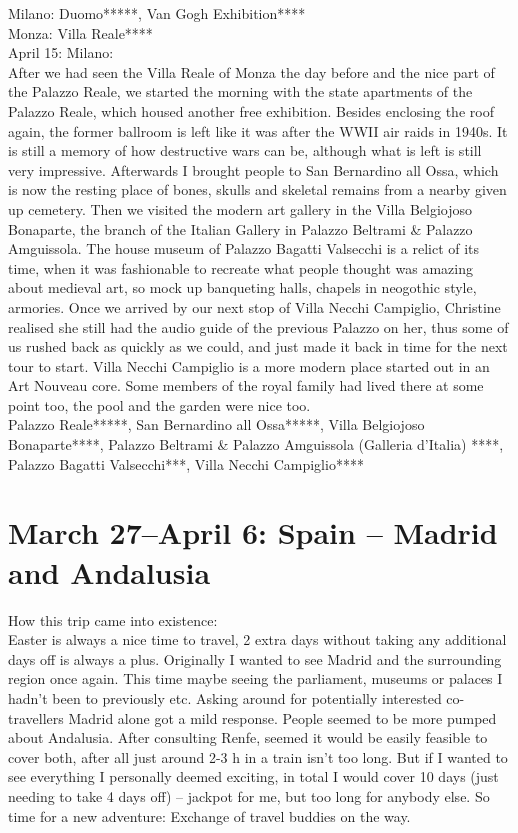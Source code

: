 Milano: Duomo*****, Van Gogh Exhibition****\\
Monza: Villa Reale****\\

April 15: Milano:\\
After we had seen the Villa Reale of Monza the day before and the nice part of the Palazzo Reale, we started the morning with the state apartments of the Palazzo Reale, which housed another free exhibition. Besides enclosing the roof again, the former ballroom is left like it was after the WWII air raids in 1940s. It is still a memory of how destructive wars can be, although what is left is still very impressive. Afterwards I brought people to San Bernardino all Ossa, which is now the resting place of bones, skulls and skeletal remains from a nearby given up cemetery. Then we visited the modern art gallery in the Villa Belgiojoso Bonaparte, the branch of the Italian Gallery in Palazzo Beltrami \& Palazzo Amguissola. The house museum of Palazzo Bagatti Valsecchi is a relict of its time, when it was fashionable to recreate what people thought was amazing about medieval art, so mock up banqueting halls, chapels in neogothic style, armories. Once we arrived by our next stop of Villa Necchi Campiglio, Christine realised she still had the audio guide of the previous Palazzo on her, thus some of us rushed back as quickly as we could, and just made it back in time for the next tour to start. Villa Necchi Campiglio is a more modern place started out in an Art Nouveau core. Some members of the royal family had lived there at some point too, the pool and the garden were nice too.\\

Palazzo Reale*****, San Bernardino all Ossa*****, Villa Belgiojoso Bonaparte****, Palazzo Beltrami \& Palazzo Amguissola (Galleria d'Italia) ****, Palazzo Bagatti Valsecchi***, Villa Necchi Campiglio****

\section{March 27--April 6: Spain -- Madrid and Andalusia}
\label{2015:Spain}

How this trip came into existence:\\
Easter is always a nice time to travel, 2 extra days without taking any additional days off is always a plus. Originally I wanted to see Madrid and the surrounding region once again.  This time maybe seeing the parliament, museums or palaces I hadn't been to previously etc. Asking around for potentially interested co-travellers Madrid alone got a mild response. People seemed to be more pumped about Andalusia. After consulting Renfe, seemed it would be easily feasible to cover both, after all just around 2-3 h in a train isn't too long. But if I wanted to see everything I personally deemed exciting, in total I would cover 10 days (just needing to take 4 days off) -- jackpot for me, but too long for anybody else. So time for a new adventure: Exchange of travel buddies on the way.\\

